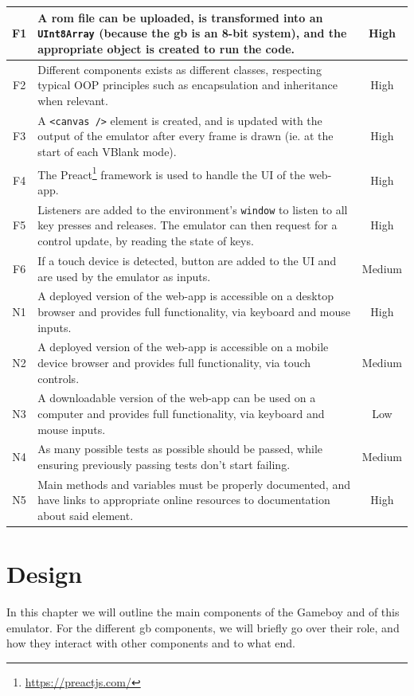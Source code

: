 \documentclass[11pt]{report}
\newcommand{\ftnt}[1]{\footnote{\url{#1}}}
\begin{document}
\begin{xltabular}{\textwidth}{|c|X|c|}
    F1 & A \gls{rom} file can be uploaded, is transformed into an \texttt{UInt8Array} (because the \gls{gb} is an 8-bit system), and the appropriate object is created to run the code. & High \\ \hline
    F2 & Different components exists as different classes, respecting typical OOP principles such as encapsulation and inheritance when relevant. & High \\ \hline
    F3 & A \texttt{<canvas />} element is created, and is updated with the output of the emulator after every frame is drawn (ie. at the start of each VBlank mode). & High \\ \hline
    F4 & The Preact\ftnt{https://preactjs.com/} framework is used to handle the UI of the web-app. & High \\ \hline
    F5 & Listeners are added to the environment's \texttt{window} to listen to all key presses and releases. The emulator can then request for a control update, by reading the state of keys. & High \\ \hline
    F6 & If a touch device is detected, button are added to the UI and are used by the emulator as inputs. & Medium \\ \hline

    N1 & A deployed version of the web-app is accessible on a desktop browser and provides full functionality, via keyboard and mouse inputs. & High \\ \hline
    N2 & A deployed version of the web-app is accessible on a mobile device browser and provides full functionality, via touch controls. & Medium \\ \hline
    N3 & A downloadable version of the web-app can be used on a computer and provides full functionality, via keyboard and mouse inputs. & Low \\ \hline
    N4 & As many possible tests as possible should be passed, while ensuring previously passing tests don't start failing. & Medium \\ \hline
    N5 & Main methods and variables must be properly documented, and have links to appropriate online resources to documentation about said element. & High \\ \hline
\end{xltabular}

\chapter{Design}

In this chapter we will outline the main components of the Gameboy and of this emulator. For the different \gls{gb} components, we will briefly go over their role, and how they interact with other components and to what end.
\end{document}
